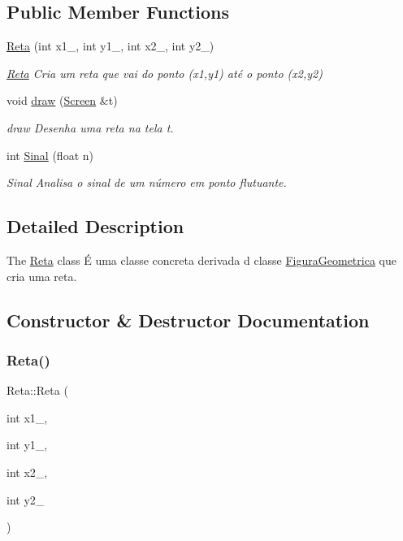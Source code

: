 \subsection*{Public Member Functions}
\begin{DoxyCompactItemize}
\item 
\hyperlink{class_reta_a9e125389d2176bba3c1430f5041beb83}{Reta} (int x1\+\_\+, int y1\+\_\+, int x2\+\_\+, int y2\+\_\+)
\begin{DoxyCompactList}\small\item\em \hyperlink{class_reta}{Reta} Cria um reta que vai do ponto (x1,y1) até o ponto (x2,y2) \end{DoxyCompactList}\item 
void \hyperlink{class_reta_ac2e9805183cd474b62bffd8b032cd780}{draw} (\hyperlink{class_screen}{Screen} \&t)
\begin{DoxyCompactList}\small\item\em draw Desenha uma reta na tela t. \end{DoxyCompactList}\item 
int \hyperlink{class_reta_ac148699b1fd8a77732d9e0546318ad58}{Sinal} (float n)
\begin{DoxyCompactList}\small\item\em Sinal Analisa o sinal de um número em ponto flutuante. \end{DoxyCompactList}\end{DoxyCompactItemize}


\subsection{Detailed Description}
The \hyperlink{class_reta}{Reta} class É uma classe concreta derivada d classe \hyperlink{class_figura_geometrica}{Figura\+Geometrica} que cria uma reta. 

\subsection{Constructor \& Destructor Documentation}
\mbox{\label{class_reta_a9e125389d2176bba3c1430f5041beb83}} 
\subsubsection{\texorpdfstring{Reta()}{Reta()}}
{\footnotesize\ttfamily Reta\+::\+Reta (\begin{DoxyParamCaption}\item[{int}]{x1\+\_\+,  }\item[{int}]{y1\+\_\+,  }\item[{int}]{x2\+\_\+,  }\item[{int}]{y2\+\_\+ }\end{DoxyParamCaption})}



